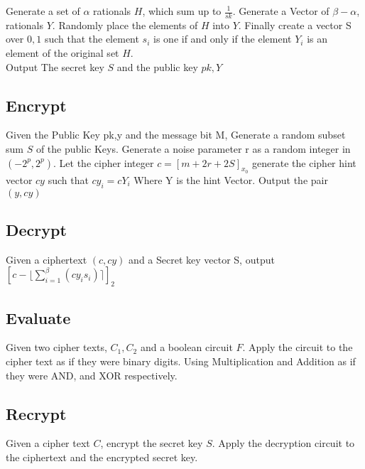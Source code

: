 \documentclass[letterpaper,11pt]{article} %
\begin{document}
Generate a set of $\alpha$ rationals $H$, which sum up to $\frac{1}{sk}$. Generate a Vector of $\beta - \alpha$, rationals $Y.$ Randomly place the elements of $H$ into $Y$. Finally create a vector S over $0,1$ such that the element $s_i$ is one if and only if the element $Y_i$ is an element of the original set $H$.\\

Output The secret key $S$ and the public key $pk,Y$\\

\subsection*{Encrypt}
Given the Public Key pk,y and the message bit M, Generate a random subset sum $S$ of the public Keys. Generate a noise parameter r as a random integer in $(-2^p,2^p)$. Let the cipher integer $c=[m+2r+2S]_{x_0}$ generate the cipher hint vector $cy$ such that $cy_i=cY_i$
Where Y is the hint Vector. Output the pair $(y,cy)$\\

\subsection*{Decrypt}
	Given a ciphertext $(c,cy)$ and a Secret key vector S, output $[c-\lfloor \sum\limits_{i=1}^\beta (cy_is_i) \rceil ]_2$\\
\subsection*{Evaluate}
Given two cipher texts, $C_1, C_2$ and a boolean circuit $F$. Apply the circuit to the cipher text as if they were binary digits. Using Multiplication and Addition as if they were AND, and XOR respectively. 
\subsection*{Recrypt}
Given a cipher text $C$, encrypt the secret key $S$. Apply the decryption circuit to the ciphertext and the encrypted secret key.
\\
\end{document}
